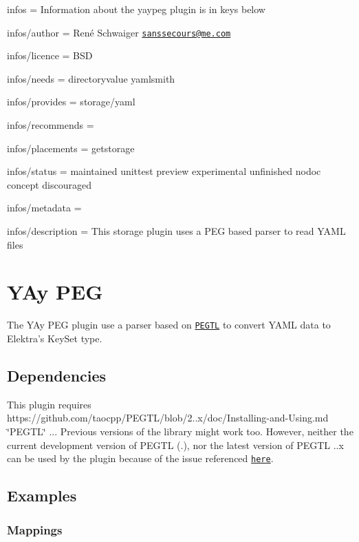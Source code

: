 
\begin{DoxyItemize}
\item infos = Information about the yaypeg plugin is in keys below
\item infos/author = René Schwaiger \href{mailto:sanssecours@me.com}{\tt sanssecours@me.\+com}
\item infos/licence = B\+SD
\item infos/needs = directoryvalue yamlsmith
\item infos/provides = storage/yaml
\item infos/recommends =
\item infos/placements = getstorage
\item infos/status = maintained unittest preview experimental unfinished nodoc concept discouraged
\item infos/metadata =
\item infos/description = This storage plugin uses a P\+EG based parser to read Y\+A\+ML files
\end{DoxyItemize}\hypertarget{md_src_plugins_yaypeg_README_src_plugins_yaypeg_README_md}{}\section{Y\+Ay P\+EG}\label{md_src_plugins_yaypeg_README_src_plugins_yaypeg_README_md}
The Y\+Ay P\+EG plugin use a parser based on \href{https://github.com/taocpp/PEGTL}{\tt P\+E\+G\+TL} to convert Y\+A\+ML data to Elektra’s {\ttfamily Key\+Set} type.

\subsection*{Dependencies}

This plugin requires https\+://github.com/taocpp/\+P\+E\+G\+T\+L/blob/2..\+x/doc/\+Installing-\/and-\/\+Using.md \char`\"{}\+P\+E\+G\+T\+L\char`\"{} {..}. Previous versions of the library might work too. However, neither the current development version of P\+E\+G\+TL ({.}), nor the latest version of P\+E\+G\+TL {..\+x} can be used by the plugin because of the issue referenced \href{https://github.com/taocpp/PEGTL/issues/143}{\tt here}.

\subsection*{Examples}

\subsubsection*{Mappings}

